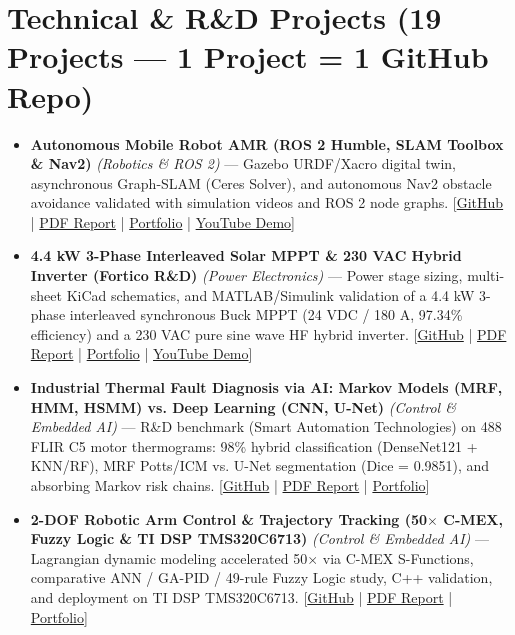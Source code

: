 \documentclass[10pt,a4paper]{article}
\begin{document}
\section*{Technical \& R\&D Projects (19 Projects — 1 Project = 1 GitHub Repo)}
\begin{itemize}
\item \textbf{Autonomous Mobile Robot AMR (ROS 2 Humble, SLAM Toolbox \& Nav2)} \textit{(Robotics \& ROS 2)} --- Gazebo URDF/Xacro digital twin, asynchronous Graph-SLAM (Ceres Solver), and autonomous Nav2 obstacle avoidance validated with simulation videos and ROS 2 node graphs. [\href{https://github.com/scidelo-andriasahy/ros2-amr-slam-nav2}{GitHub} | \href{https://scidelo-andriasahy.github.io/assets/pdfs/Rapport_Projet_AMR_ROS2.pdf}{PDF Report} | \href{https://scidelo-andriasahy.github.io/?project=1}{Portfolio} | \href{https://youtu.be/BdZKrr3qsLc}{YouTube Demo}]
\item \textbf{4.4 kW 3-Phase Interleaved Solar MPPT \& 230 VAC Hybrid Inverter (Fortico R\&D)} \textit{(Power Electronics)} --- Power stage sizing, multi-sheet KiCad schematics, and MATLAB/Simulink validation of a 4.4 kW 3-phase interleaved synchronous Buck MPPT (24 VDC / 180 A, 97.34\% efficiency) and a 230 VAC pure sine wave HF hybrid inverter. [\href{https://github.com/scidelo-andriasahy/mppt-4kw-hybrid-inverter-fortico}{GitHub} | \href{https://scidelo-andriasahy.github.io/assets/pdfs/Rapport_Simulation_MPPT_4kW_Fortico.pdf}{PDF Report} | \href{https://scidelo-andriasahy.github.io/?project=2}{Portfolio} | \href{https://youtu.be/MCnFn3AhC5s}{YouTube Demo}]
\item \textbf{Industrial Thermal Fault Diagnosis via AI: Markov Models (MRF, HMM, HSMM) vs. Deep Learning (CNN, U-Net)} \textit{(Control \& Embedded AI)} --- R\&D benchmark (Smart Automation Technologies) on 488 FLIR C5 motor thermograms: 98\% hybrid classification (DenseNet121 + KNN/RF), MRF Potts/ICM vs. U-Net segmentation (Dice = 0.9851), and absorbing Markov risk chains. [\href{https://github.com/scidelo-andriasahy/PROJET_THERMIQUE_2}{GitHub} | \href{https://scidelo-andriasahy.github.io/assets/pdfs/Rapport_PFA_Diagnostic_Thermique_IA_SAT.pdf}{PDF Report} | \href{https://scidelo-andriasahy.github.io/?project=3}{Portfolio}]
\item \textbf{2-DOF Robotic Arm Control \& Trajectory Tracking (50$\times$ C-MEX, Fuzzy Logic \& TI DSP TMS320C6713)} \textit{(Control \& Embedded AI)} --- Lagrangian dynamic modeling accelerated 50$\times$ via C-MEX S-Functions, comparative ANN / GA-PID / 49-rule Fuzzy Logic study, C++ validation, and deployment on TI DSP TMS320C6713. [\href{https://github.com/scidelo-andriasahy/robot-2dof-fuzzy-gapid-dsp-tms320c6713}{GitHub} | \href{https://scidelo-andriasahy.github.io/assets/pdfs/ROBOT2DOF_Scidelo_EN.pdf}{PDF Report} | \href{https://scidelo-andriasahy.github.io/?project=4}{Portfolio}]

\end{itemize}
\end{document}
